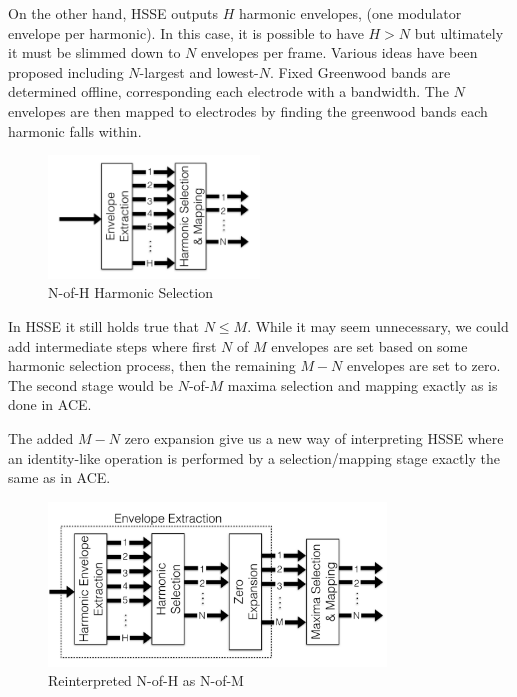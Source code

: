 \documentclass [11pt, proquest] {uwthesis}[2015/03/03]
\begin{document}
On the other hand, HSSE outputs $H$ harmonic envelopes, (one modulator envelope per harmonic).  In this case, it is possible to have $H>N$ but ultimately it must be slimmed down to $N$ envelopes per frame.  Various ideas have been proposed including $N$-largest and lowest-$N$.  Fixed Greenwood bands are determined offline, corresponding each electrode with a bandwidth.  The $N$ envelopes are then mapped to electrodes by finding the greenwood bands each harmonic falls within.

\begin{figure}[!ht]
  \centering
    \includegraphics[width=0.5\textwidth]{HSSE_selection_oldTEMP}   
    \caption{N-of-H Harmonic Selection}
\end{figure}



In HSSE it still holds true that $N \leq M$.  While it may seem unnecessary, we could add intermediate steps where first $N$ of $M$ envelopes are set based on some harmonic selection process, then the remaining $M-N$ envelopes are set to zero.  The second stage would be $N$-of-$M$ maxima selection and mapping exactly as is done in ACE.

The added $M-N$ zero expansion give us a new way of interpreting HSSE where an identity-like operation is performed by a selection/mapping stage exactly the same as in ACE.

\begin{figure}[!ht]
  \centering
    \includegraphics[width=0.8\textwidth]{HSSE_selection_newTEMP}   
    \caption{Reinterpreted N-of-H as N-of-M}
\end{figure}
\end{document}
